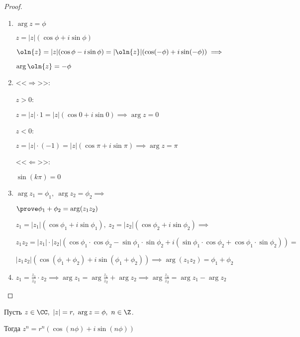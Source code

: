 \begin{proof}
    \begin{enumerate}
        \item $\arg z = \phi$
        
        $z = |z|(\cos\phi + i\sin\phi)$
        
        $\oln{z} = |z|(\cos\phi - i\sin\phi) = |\oln{z}|(\cos(-\phi) + i\sin(-\phi)) \implies$
        
        $\arg \oln{z} = -\phi$

        \item 
        <<$\Rightarrow$>>:
        
        $z > 0$: 
        
        $z = |z| \cdot 1 = |z|(\cos 0 + i\sin 0) \implies \arg z = 0$
        
        $z < 0$: 
        
        $z = |z| \cdot (-1) = |z|(\cos \pi + i\sin \pi) \implies \arg z = \pi$
        
        <<$\Leftarrow$>>:
        
        $\sin(k \pi) = 0$

        \item $\arg z_1 = \phi_1,~\arg z_2 = \phi_2 \implies$
        
        $\prove \phi_1 + \phi_2 = \arg(z_1 z_2)$
        
        $z_1 = |z_1|(\cos\phi_1 + i\sin\phi_1),~ z_2 = |z_2|(\cos\phi_2 + i\sin\phi_2) \implies$
        
        $z_1 z_2 = |z_1| \cdot |z_2|(\cos\phi_1 \cdot \cos\phi_2 - \sin\phi_1 \cdot \sin\phi_2 + i(\sin\phi_1 \cdot \cos\phi_2 + \cos\phi_1 \cdot \sin\phi_2)) =$
        
        $|z_1 z_2|(\cos(\phi_1 + \phi_2) + i\sin(\phi_1 + \phi_2)) \implies \arg(z_1 z_2) = \phi_1 + \phi_2$

        \item $z_1 = \frac{z_1}{z_2} \cdot z_2 \implies \arg z_1 = \arg \frac{z_1}{z_2} + \arg z_2 \implies \arg \frac{z_1}{z_2} = \arg z_1 - \arg z_2$

    \end{enumerate}
\end{proof}

\begin{follow}

    Пусть $z \in \CC,~|z| = r,~\arg z = \phi,~n \in \Z$.

    Тогда $z^n = r^n(\cos(n\phi) + i\sin(n\phi))$
\end{follow}

